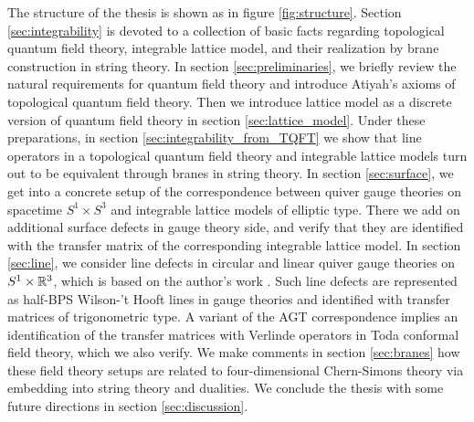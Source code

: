 The structure of the thesis is shown as in figure \ref{fig:structure}.
Section \ref{sec:integrability} is devoted to a collection of basic facts regarding
topological quantum field theory, integrable lattice model, and
their realization by brane construction in string theory.
In section \ref{sec:preliminaries}, we briefly review the natural requirements for quantum field theory
and introduce Atiyah's axioms of topological quantum field theory. Then we introduce lattice model as
a discrete version of quantum field theory in section \ref{sec:lattice_model}.
Under these preparations, in section \ref{sec:integrability_from_TQFT}
we show that line operators in a topological quantum field theory and
integrable lattice models turn out to be equivalent through branes in string theory.
In section \ref{sec:surface}, we get into a concrete setup of the correspondence
between quiver gauge theories on spacetime $S^1\times S^3$ and
integrable lattice models of elliptic type.
There we add on additional surface defects in gauge theory side, and verify that they are
identified with the transfer matrix of the corresponding integrable lattice model.
In section \ref{sec:line}, we consider line defects in circular and linear quiver gauge
theories on $S^1\times \mathbb{R}^3$, which is based on the author's work \cite{Maruyoshi:2020cwy}.
Such line defects are represented as half-BPS Wilson-'t Hooft lines in gauge theories and
identified with transfer matrices of trigonometric type.
A variant of the AGT correspondence implies an identification of the transfer matrices with
Verlinde operators in Toda conformal field theory, which we also verify.
We make comments in section \ref{sec:branes} how these field theory setups are
related to four-dimensional Chern-Simons theory via embedding into string theory and dualities.
We conclude the thesis with some future directions in section \ref{sec:discussion}.


